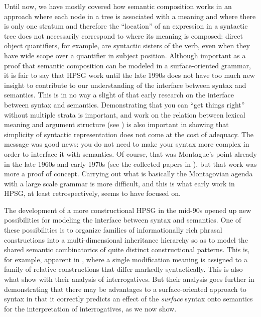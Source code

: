 \documentclass[output=paper,biblatex,babelshorthands,newtxmath,draftmode,colorlinks,citecolor=brown]{langscibook}
\begin{document}
Until now, we have mostly covered how semantic composition works in an approach where each node in a tree is associated with a meaning and where there is only one stratum and therefore the ``location'' of an expression in a syntactic tree does not necessarily correspond to where its meaning is composed: direct object quantifiers, for example, are syntactic sisters of the verb, even when they have wide scope over a quantifier in subject position. Although important as a proof that semantic composition can be modeled in a surface-oriented grammar, it is fair to say that HPSG work until the late 1990s does not have too much new insight to contribute to our understanding of the interface between syntax and semantics. This is in no way a slight of that early research on the interface between syntax and semantics. Demonstrating that you can ``get things right'' without multiple strata is important, and work on the relation between lexical meaning and argument structure (see ) is also important in showing that simplicity of syntactic representation does not come at the cost of adequacy. The message was good news: you do not need to make your syntax more complex in order to interface it with semantics. Of course, that was Montague's point already in the late 1960s and early 1970s (see the collected papers in \citealt{Montague1974}), but that work was more a proof of concept.  Carrying out what is basically the Montagovian agenda with a large scale grammar is more difficult, and this is what early work in HPSG, at least retrospectively, seems to have focused on.

The development of a more constructional HPSG in the mid-90s opened up new possibilities for modeling the interface between syntax and semantics. One of these possibilities is to organize families of informationally rich phrasal constructions into a multi-dimensional inheritance hierarchy so as to model the shared semantic combinatorics of quite distinct constructional patterns. This is, for example, apparent in \citet{Sag1997}, where a single modification meaning is assigned to a family of relative constructions that differ markedly syntactically. This is also what \citet{GinzburgandSag2001} show with their analysis of interrogatives. But their analysis goes further in demonstrating that there may be advantages to a surface-oriented approach to syntax in that it correctly predicts an effect of the \emph{surface} syntax onto semantics for the interpretation of interrogatives, as we now show. 
\end{document}
